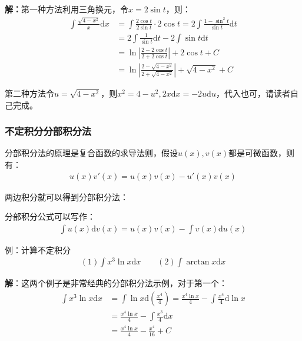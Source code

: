 \documentclass{ctexart}
\let\oldtextbf\textbf %
\renewcommand{\textbf}[1]{\textcolor{btex}{\oldtextbf{#1}}} %
\begin{document}
\textbf{解：}第一种方法利用三角换元，令$x=2\sin t$，则：
\begin{align*}
    \int\frac{\sqrt{4-x^2}}{x}\mathrm{d}x&=\int\frac{2\cos t}{2\sin t}\cdot 2\cos t=2\int\frac{1-\sin^2 t}{\sin t}\mathrm{d}t\\
    &=2\int\frac{1}{\sin t}\mathrm{d}t-2\int \sin t\mathrm{d}t\\
    &=\ln|\frac{2-2\cos t}{2+2\cos t}|+2\cos t+C\\
    &=\ln|\frac{2-\sqrt{4-x^2}}{2+\sqrt{4-x^2}}|+\sqrt{4-x^2}+C
\end{align*}

第二种方法令$u=\sqrt{4-x^2}$，则$x^2=4-u^2,2x\mathrm{d}x=-2u\mathrm{d}u$，代入也可，请读者自己完成。

\subsubsection{不定积分分部积分法}
分部积分法的原理是复合函数的求导法则，假设$u(x),v(x)$都是可微函数，则有：
\begin{align*}
    u(x)v'(x)=u(x)v(x)-u'(x)v(x)
\end{align*}

两边积分就可以得到分部积分法：
\begin{tcolorbox}[
    colback=bac2,     %
    colframe=fra2,   %
    coltitle=white,             %
    coltext=tex2,
    title=不定积分分部积分法,
    fonttitle=\bfseries,        %
arc=3mm,                     %
breakable
]
分部积分公式可以写作：
\begin{align*}
    \int u(x)\mathrm{d}v(x)=u(x)v(x)-\int v(x)\mathrm{d}u(x)
\end{align*}
\end{tcolorbox}

例：计算不定积分
\begin{align*}
    (1)\int x^3\ln x\mathrm{d}x\qquad (2)\int \arctan x\mathrm{d}x
\end{align*}

\textbf{解}：这两个例子是非常经典的分部积分法示例，对于第一个：
\begin{align*}
    \int x^3\ln x\mathrm{d}x&=\int\ln x\mathrm{d}(\frac{x^4}{4})=\frac{x^4\ln x}{4}-\int\frac{x^4}{4}\mathrm{d}\ln x\\
&=\frac{x^4\ln x}{4}-\int\frac{x^3}{4}\mathrm{d}x\\
&=\frac{x^4\ln x}{4}-\frac{x^4}{16}  +C      
\end{align*}
\end{document}

